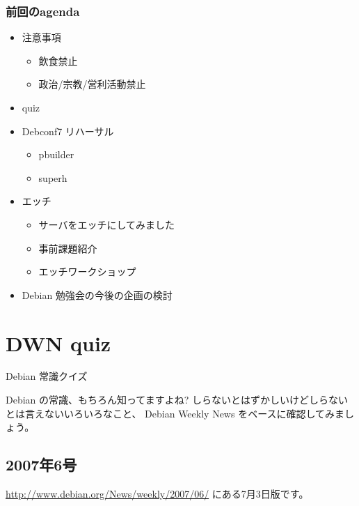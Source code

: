 \documentclass[cjk,dvipdfmx,12pt]{beamer}
\begin{document}
\begin{frame}
 \frametitle{前回のagenda}
\begin{minipage}[t]{0.45\hsize}
  \begin{itemize}
  \item 注意事項
	\begin{itemize}
	 \item 飲食禁止
	 \item 政治/宗教/営利活動禁止
	\end{itemize}
  \item quiz
  \item Debconf7 リハーサル
	\begin{itemize}
	 \item pbuilder 
	 \item superh
	\end{itemize}
 \end{itemize}
\end{minipage} 
\begin{minipage}[t]{0.45\hsize}
 \begin{itemize}
  \item エッチ
	\begin{itemize}
	 \item サーバをエッチにしてみました
	 \item 事前課題紹介
	 \item エッチワークショップ
	\end{itemize}  
\item Debian 勉強会の今後の企画の検討
 \end{itemize}
\end{minipage}
\end{frame}

\section{DWN quiz}
\begin{frame}{Debian 常識クイズ}

Debian の常識、もちろん知ってますよね?
しらないとはずかしいけどしらないとは言えないいろいろなこと、
Debian Weekly News をベースに確認してみましょう。

\end{frame}

\subsection{2007年6号}
\url{http://www.debian.org/News/weekly/2007/06/}
にある7月3日版です。
\end{document}
